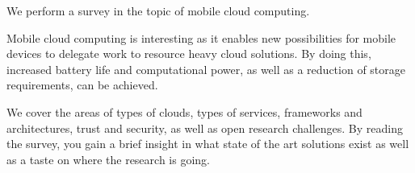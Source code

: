 We perform a survey in the topic of mobile cloud computing.

Mobile cloud computing is interesting as it enables new possibilities for mobile devices to delegate work to resource heavy cloud solutions.
By doing this, increased battery life and computational power, as well as a reduction of storage requirements, can be achieved. 

We cover the areas of types of clouds, types of services, frameworks and architectures, trust and security, as well as open research challenges.
By reading the survey, you gain a brief insight in what state of the art solutions exist as well as a taste on where the research is going.